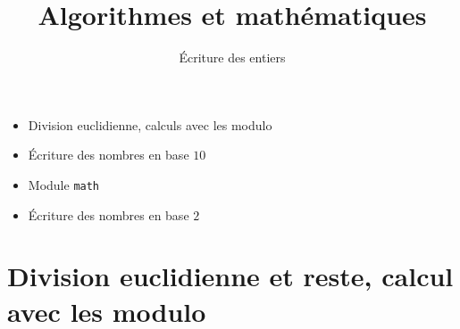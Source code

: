 



\newcommand{\Python}{\texttt{Python}}
\renewcommand{\evidence}[1]{{\color{blue}\textbf{#1}}}

\usepackage{textcomp}

\usepackage{listings}



\newcommand{\codeinline}[1]{\lstinline!#1!}







\title{{\bf Algorithmes et mathématiques}}
\subtitle{\'Ecriture des entiers}

\begin{frame}
  
  \debutmontitre

  \pause

{\footnotesize
\hfill
{}
\begin{minipage}{0.6\textwidth}
  \begin{itemize}
    \item<3-> Division euclidienne, calculs avec les modulo
    \item<4-> \'Ecriture des nombres en base $10$
    \item<5-> Module \codeinline{math}
    \item<6-> \'Ecriture des nombres en base $2$ 
  \end{itemize}
\end{minipage}
}

\end{frame}

\setcounter{framenumber}{0}


\section{Division euclidienne et reste, calcul avec les modulo}


